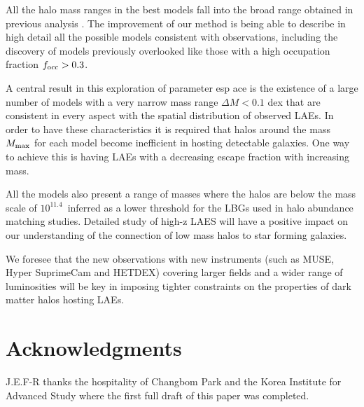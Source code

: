 \documentclass[usenatbib]{mn2e}
\newcommand{\ly}{{\ifmmode{{\rm Ly}\alpha}\else{Ly$\alpha$~}\fi}}
\newcommand{\hMsun}{{\ifmmode{h^{-1}{\rm
        {M_{\odot}}}}\else{$h^{-1}{\rm{M_{\odot}}}$}\fi}}
\begin{document}
All the halo mass ranges in the best models fall into the broad
range obtained in previous analysis \citep{Gawiser2007}. The
improvement of our method is being able to describe in high detail
all the possible models consistent with observations, including the
discovery of models previously overlooked like those with a high
occupation fraction $f_{\rm occ}>0.3$.
 

A central result in this exploration of parameter esp ace is the
existence of a large number of models with a very
narrow mass range $\Delta M< 0.1$ dex that are consistent in every
aspect with the spatial distribution of observed LAEs. In order to
have these characteristics it is required that halos around the mass
$M_{\rm max}$ for each model become inefficient in hosting detectable
galaxies. One way to achieve this is having LAEs with a decreasing \ly
escape fraction with increasing mass. 

All the models also present a range of masses where the halos are
below the mass scale of $10^{11.4}$\hMsun \  inferred as a lower
threshold for the LBGs used in halo abundance matching
studies. Detailed study of high-z LAES will have a positive impact on
our understanding of the connection of low mass halos to star forming
galaxies.

We foresee that the new observations with new instruments (such as MUSE,
Hyper SuprimeCam and HETDEX) covering larger fields and a wider range
of luminosities will be key in imposing tighter constraints on the
properties of dark matter halos hosting LAEs.  


\section*{Acknowledgments} 
J.E.F-R thanks the hospitality of Changbom Park and the Korea
Institute for Advanced Study where the first full draft of this paper
was completed.
\end{document}
